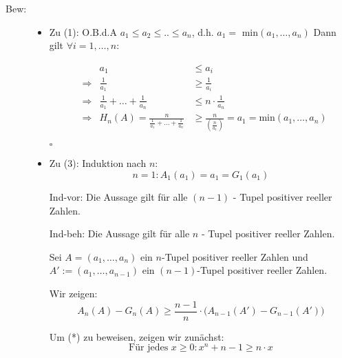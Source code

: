 \documentclass[12pt,a4paper,leqno]{article}
\begin{document}
  \newpage
  \begin{description}
    \item[Bew:] \hfill
      
      \begin{itemize}
        
        \item[] Zu (1): O.B.d.A $a_1 \leq a_2 \leq .. \leq a_n$, d.h. $a_1 =$ min$(a_1,\dotsc, a_n)$
          Dann gilt $\forall i = 1,\dotsc, n$:
          
          \begin{align*}
            & &a_1 &\leq a_i \\
            &\Rightarrow &\frac{1}{a_1} &\geq \frac{1}{a_i} \\
            &\Rightarrow &\frac{1}{a_1} + \ldots + \frac{1}{a_n} &\leq n  \cdot  \frac{1}{a_n} \\
            &\Rightarrow &H_n(A) = \frac{n}{\frac{1}{a_1} + \ldots + \frac{1}{a_n}} &\geq 
            \frac{n}{\left(\frac{n}{a_1}\right)} = a_1 = \textrm{min}(a_1,\dotsc, a_n)
          \end{align*}
          \begin{flushright}$\square$\end{flushright}
          
        \item[] Zu (3): Induktion nach $n$:
          $$n = 1: A_1(a_1) = a_1 = G_1(a_1)$$
          
          Ind-vor: Die Aussage gilt für alle $(n-1)$ - Tupel positiver reeller Zahlen.
          
          Ind-beh: Die Aussage gilt für alle $n$  - Tupel positiver reeller Zahlen.
          
          Sei $A=(a_1,\dotsc, a_n)$ ein $n$-Tupel positiver reeller Zahlen und\\
          $A' := (a_1,\dotsc, a_{n-1})$ ein $(n-1)$-Tupel positiver reeller Zahlen.
          
          
          Wir zeigen:
          \renewcommand{\theequation}{*} 
          \begin{equation}  
            A_n(A) - G_n(A) \geq \frac{n-1}{n}    \cdot  \bigg( A_{n-1}(A') - G_{n-1}(A')\bigg)
          \end{equation}
          
          Um (*) zu beweisen, zeigen wir zunächst:
          \renewcommand{\theequation}{**} 
          \begin{equation}  
            \textrm{Für jedes } x \geq 0 : x ^ n + n - 1 \geq n  \cdot  x
          \end{equation}
          

\end{itemize}
\end{description}
\end{document}
